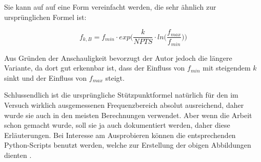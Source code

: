 {\begin{minipage}[t]{.265\textwidth}
        Sie kann auf auf eine Form  vereinfacht werden, die sehr \"ahnlich zur
        urspr\"unglichen Formel ist:

        \begin{equation*}
            f_{k,B} = f_{min} \cdot exp\Biggl(\frac{k}{NPTS} \cdot ln\biggl(\frac{f_{max}}{f_{min}}\biggr) \Biggr)
        \end{equation*}

    \end{minipage}%
    \begin{minipage}[t]{.3675\textwidth}
        \vspace{0em}
        \resizebox{\textwidth}{!}{}
        \label{fig:stuetzpunkte:high}
    \end{minipage}%
    \begin{minipage}[t]{.3675\textwidth}
        \vspace{0em}
        \resizebox{\textwidth}{!}{}
        \label{fig:stuetzpunkte:low}
    \end{minipage}

    \vspace{0.3em}
    \begin{minipage}[t]{\textwidth}
    Aus  Gr\"unden  der  Anschauligkeit  bevorzugt der  Autor  jedoch  die
    l\"angere Variante, da  dort gut erkennbar ist, dass  der Einfluss von
    $f_{min}$  mit steigendem  $k$ sinkt  und der  Einfluss von  $f_{max}$
    steigt.

    \vspace{0.1em}
    Schlussendlich  ist  die  urspr\"ungliche  St\"utzpunktformel  nat\"urlich
    f\"ur  den  im  Versuch  wirklich  ausgemessenen  Frequenzbereich  absolut
    ausreichend,   daher  wurde   sie   auch  in   den  meisten   Berechnungen
    verwendet. Aber  wenn  die  Arbeit  schon   gemacht  wurde,  soll  sie  ja
    auch dokumentiert  werden, daher  diese Erl\"auterungen. Bei  Interesse am
    Ausprobieren  k\"onnen die  entsprechenden Python-Scripts  benutzt werden,
    welche zur Erstellung der obigen Abbildungen dienten \cite{ref:aw:github}.
    \end{minipage}


\clearpage
} %


